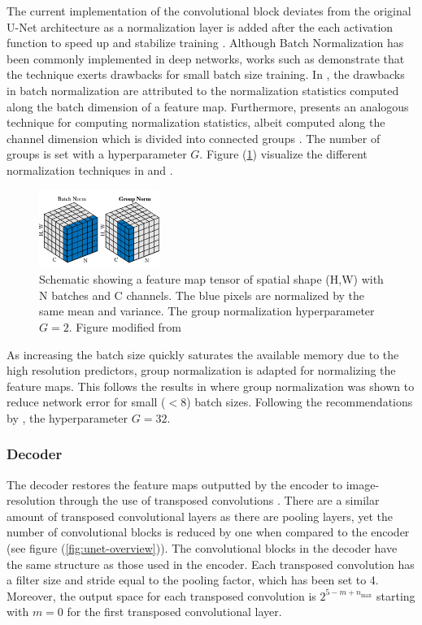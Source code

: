 \documentclass[../main/thesis]{subfiles}
\begin{document}
The current implementation of the convolutional block deviates from the original U-Net architecture as a normalization layer is added after the each activation function to speed up and stabilize training \citep{Ioffe2015}. Although Batch Normalization has been commonly implemented in deep networks, works such as \citet{Wu2018} demonstrate that the technique exerts drawbacks for small batch size training. In \citet{Wu2018}, the drawbacks in batch normalization are attributed to the normalization statistics computed along the batch dimension of a feature map. Furthermore, \citet{Wu2018} presents an analogous technique for computing normalization statistics, albeit computed along the channel dimension which is divided into connected groups \citep{Wu2018}. The number of groups is set with a hyperparameter $G$. Figure (\ref{fig:BNGN}) visualize the different normalization techniques in \citet{Ioffe2015} and \citet{Wu2018}.

\begin{figure}
    \centering
    \includegraphics[width=0.35\textwidth]{BNandGN.png}
    \caption{\label{fig:BNGN}Schematic showing a feature map tensor of spatial shape (H,W) with N batches and C channels. The blue pixels are normalized by the same mean and variance. The group normalization hyperparameter $G = 2$. Figure modified from \protect\citep{Wu2018}}
\end{figure}

As increasing the batch size quickly saturates the available memory due to the high resolution predictors, group normalization is adapted for normalizing the feature maps. This follows the results in \citet{Wu2018} where group normalization was shown to reduce network error for small ($<8$) batch sizes. Following the recommendations by \citet{Wu2018}, the hyperparameter $G=32$. 

\subsubsection{Decoder}
The decoder restores the feature maps outputted by the encoder to image-resolution through the use of transposed convolutions \citep{Zeiler2010}. There are a similar amount of transposed convolutional layers as there are pooling layers, yet the number of convolutional blocks is reduced by one when compared to the encoder (see figure (\ref{fig:unet-overview})). The convolutional blocks in the decoder have the same structure as those used in the encoder. Each transposed convolution has a filter size and stride equal to the pooling factor, which has been set to 4. Moreover, the output space for each transposed convolution is $2^{5 - m + n_{\text{max}}}$ starting with $m = 0$ for the first transposed convolutional layer.
\end{document}
